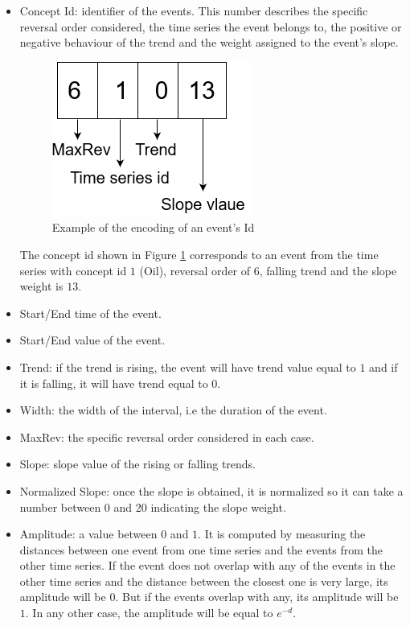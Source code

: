 \documentclass[a4, 11pt]{article}
\begin{document}
\begin{itemize}
    \item Concept Id: identifier of the events. This number describes the specific reversal order considered, the time series the event belongs to, the positive or negative behaviour of the trend and the weight assigned to the event's slope. 
           \begin{figure}[!ht]
           \centering
           \includegraphics[scale=0.5]{id.png}
           \caption{Example of the encoding of an event's Id}
           \label{fig:id}
       \end{figure}
        The concept id shown in Figure \ref{fig:id} corresponds to an event from the time series with concept id $1$ (Oil), reversal order of $6$, falling trend and the slope weight is $13$. 
    \item Start/End time of the event.
    \item Start/End value of the event. 
    \item Trend: if the trend is rising, the event will have trend value equal to $1$ and if it is falling, it will have trend equal to $0$.
    \item Width: the width of the interval, i.e the duration of the event.  
    \item MaxRev: the specific reversal order considered in each case.
    \item Slope: slope value of the rising or falling trends. 
    \item Normalized Slope: once the slope is obtained, it is normalized so it can take a number between 0 and 20 indicating the slope weight. 
    \item Amplitude: a value between $0$ and $1$. It is computed by measuring the distances between one event from one time series and the events from the other time series. If the event does not overlap with any of the events in the other time series and the distance between the closest one is very large, its amplitude will be 0. But if the events overlap with any, its amplitude will be $1$. In any other case, the amplitude will be equal to $e^{-d}$.
\end{itemize}
\end{document}
